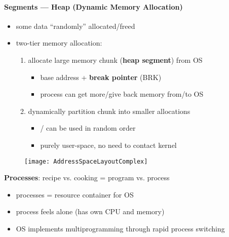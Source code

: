 \paragraph{Segments --- Heap (Dynamic Memory Allocation)}
\begin{itemize}
	\item some data "`randomly"' allocated/freed
	\item two-tier memory allocation:
	\begin{enumerate}
		\item allocate large memory chunk (\textbf{heap segment}) from OS
		\begin{itemize}
			\item base address + \textbf{break pointer} (BRK)
			\item process can get more/give back memory from/to OS
		\end{itemize}
		\item dynamically partition chunk into smaller allocations
		\begin{itemize}
			\item {}/ can be used in random order
			\item purely user-space, no need to contact kernel
		\end{itemize}
	\end{enumerate}
\end{itemize}

\begin{figure}[h]\centering\label{AddressSpaceLayoutComplex}\texttt{[image: AddressSpaceLayoutComplex]}\end{figure}

\begin{summary}
	\textbf{Processes}: recipe vs. cooking = program vs. process
	\begin{itemize}
		\item processes = resource container for OS
		\item process feels alone (has own CPU and memory) 
		\item OS implements multiprogramming through rapid process switching
	\end{itemize}
\end{summary}
